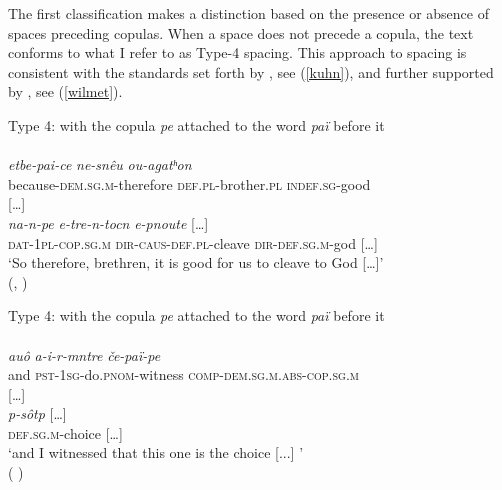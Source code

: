 \documentclass[output=paper,colorlinks,citecolor=brown ,chinesefont]{langscibook}
\begin{document}
The first classification makes a distinction based on the presence or absence of spaces preceding copulas. When a space does not precede a copula, the text conforms to what I refer to as Type-4 spacing. This approach to spacing is consistent with the standards set forth by \citet{kuhn1}, see (\ref{kuhn}), and further supported by \citet{wilmet}, see (\ref{wilmet}).
\largerpage[2]
\begin{exe}
    \ex\label{kuhn} Type 4:  \citep[12]{kuhn1} with the copula  \textit{pe} attached to the word  \textit{paï} before it\\
\glll {}    \\
\textit{etbe-pai-ce} \textit{ne-snêu} \textit{ou-agatʰon} \\
because-\textsc{dem}.\textsc{sg}.\textsc{m}-therefore \textsc{def}.\textsc{pl}-brother.\textsc{pl} 	\textsc{indef}.\textsc{sg}-good \\

\glll {}   […] \\
\textit{na-n-pe}			\textit{e-tre-n-tocn} 		\textit{e-pnoute} […] \\
\textsc{dat}-1\textsc{pl}-\textsc{cop}.\textsc{sg}.\textsc{m} 	\textsc{dir}-\textsc{caus}-\textsc{def}.\textsc{pl}-cleave \textsc{dir}-\textsc{def}.\textsc{sg}.\textsc{m}-god […] \\
\glt ‘So therefore, brethren, it is good for us to cleave to God […]' \\
\hspace*{\fill}(, \citep[11]{kuhn2})
\end{exe}

\begin{exe}
    \ex\label{wilmet} Type 4: \citep{wilmet} with the copula  \textit{pe} attached to the word  \textit{paï} before it\\
\glll {}   \\
\textit{auô} 	\textit{a-i-r-mntre} 			\textit{če-paï-pe} 			\\
and 	\textsc{pst}-1\textsc{sg}-do.\textsc{pnom}-witness 	\textsc{comp}-\textsc{dem}.\textsc{sg}.\textsc{m}.\textsc{abs}-\textsc{cop}.\textsc{sg}.\textsc{m} 	\\

\glll {} […] \\
\textit{p-sôtp} […] \\
\textsc{def}.\textsc{sg}.\textsc{m}-choice […] \\
\glt ‘and I witnessed that this one is the choice [...] ' \\
\hspace*{\fill}( \citep[377]{wilmet}) \\
\end{exe}
\end{document}
